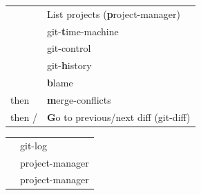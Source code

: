 \documentclass[a4paper]{article}
\newenvironment{keytable}[1]{%
  \begin{tabular}{|>{\rule{0pt}{0.85\normalbaselineskip}}l|l|}
  \hline
  \rowcolor[gray]{.8}
  \multicolumn{2}{|l|}{\bfseries #1}\\ \hline
}{%
  \end{tabular}\par\vspace{5mm}%
}
\begin{document}
\begin{center}
\begin{multicols*}{2}
\begin{keytable}{Others (plugins)}
\keys{Alt + Shift + \textbf{p}}                            & List projects (\textbf{p}roject-manager) \\ \hline
\keys{Alt + \textbf{t}}                                    & git-\textbf{t}ime-machine \\ \hline
\keys{Ctrl + Alt + o}                                      & git-control \\ \hline
\keys{Ctrl + Alt + \textbf{h}}                             & git-\textbf{h}istory \\ \hline
\keys{Ctrl + \textbf{b}}                                   & \textbf{b}lame \\ \hline
\keys{Alt + \textbf{m}} then \keys{d}                      & \textbf{m}erge-conflicts \\ \hline
\keys{Alt + \textbf{g}} then \keys{Up} / \keys{Down}       & \textbf{G}o to previous/next diff (git-diff) \\ \hline
\end{keytable}

\begin{keytable}{\rule{0pt}{0.85\normalbaselineskip}\keys{Ctrl + Shift + p} -- Command palette items}
\keys{Git Log: Show}                                       & git-log \\ \hline
\keys{Project Manager: Save Project}                       & project-manager \\ \hline
\keys{Project Manager: Edit Projects}                      & project-manager \\ \hline
\end{keytable}

\end{multicols*}
\end{center}
\end{document}
